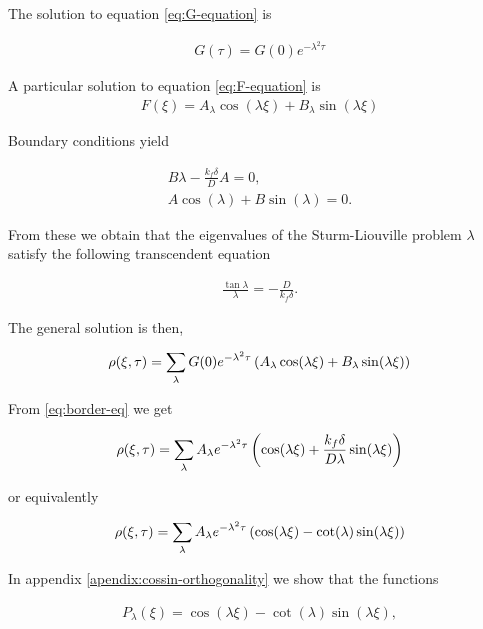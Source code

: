 The solution to equation \ref{eq:G-equation} is

\begin{align}
	G(\tau) = G(0)e^{-\lambda^2 \tau}
\end{align}

A particular solution to equation \ref{eq:F-equation} is
\begin{align}
	F(\xi) = A_\lambda \cos(\lambda \xi) + B_\lambda \sin(\lambda\xi)
\end{align}

Boundary conditions yield

\begin{align}
	B\lambda - \frac{k_f\delta}{D}A = 0,
	\label{eq:border-eq}\\
	A \cos(\lambda) + B \sin(\lambda) = 0.
\end{align}

From these we obtain that the eigenvalues of the Sturm-Liouville problem $\lambda$ satisfy the following transcendent equation

\begin{align}
	\frac{\tan\lambda}{\lambda} = -\frac{D}{k_f\delta}.
	\label{eq:lambda-equation}
\end{align}

The general solution is then,

\begin{align}
	\rho(\xi,\tau) = \sum_\lambda G(0)e^{-\lambda^2 \tau}\left({ A_\lambda \cos(\lambda\xi) + B_\lambda \sin(\lambda\xi)}\right)
\end{align}

From \ref{eq:border-eq} we get

\begin{align}
	\rho(\xi,\tau) = \sum_\lambda A_\lambda e^{-\lambda^2 \tau}\left({  \cos(\lambda\xi) + \frac{k_f \delta}{D\lambda} \sin(\lambda\xi)}\right)
\end{align}

or equivalently

\begin{align}
	\rho(\xi,\tau) = \sum_\lambda A_\lambda e^{-\lambda^2 \tau}\left({  \cos(\lambda\xi) - \cot(\lambda)\sin(\lambda\xi)}\right)
\end{align}

In appendix \ref{apendix:cossin-orthogonality} we show that the functions 

\begin{align}
	P_\lambda(\xi) = \cos(\lambda\xi) - \cot(\lambda)\sin(\lambda\xi),
\end{align}

